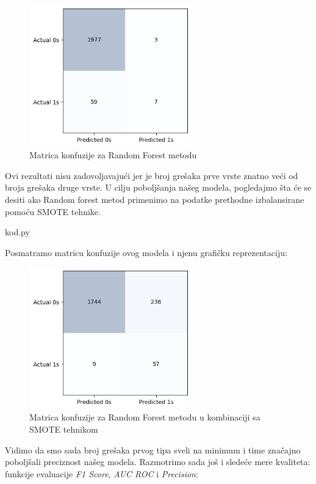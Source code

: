 \documentclass[12pt]{article}
\theoremstyle{definition}
\theoremstyle{remark}
\begin{document}
\begin{figure}[htp]
    \centering
    \includegraphics[width=7cm]{output_67_0.png}
    \caption{Matrica konfuzije za Random Forest metodu}
    \label{fig:galaxy}
\end{figure}

Ovi rezultati nisu zadovoljavajući jer je broj grešaka prve vrste znatno veći od broja grešaka druge vrste. U cilju poboljšanja našeg modela, pogledajmo šta će se desiti ako Random forest metod primenimo na podatke prethodne izbalansirane pomoću SMOTE tehnike.

\hfill

{kod.py}

\hfill

Posmatramo matricu konfuzije ovog modela i njenu grafičku reprezentaciju:

\begin{figure}[htp]
    \centering
    \includegraphics[width=7cm]{output_70_0.png}
    \caption{Matrica konfuzije za Random Forest metodu u kombinaciji sa SMOTE tehnikom}
    \label{fig:galaxy}
\end{figure}
\newpage
Vidimo da smo sada broj grešaka prvog tipa sveli na minimum i time značajno poboljšali preciznost našeg modela. Razmotrimo sada još i sledeće mere kvaliteta: funkcije evaluacije  \emph{F1 Score}, \emph{AUC ROC} i \emph{Precision}:
\end{document}

